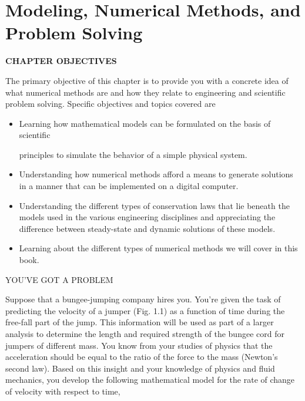 \documentclass[../main.tex]{subfiles}
\begin{document}
\chapter{Modeling, Numerical Methods, and Problem Solving}

\label{cha:cha3}


\begin{center}
\Large{\textbf{CHAPTER OBJECTIVES}}
\end{center}

\normalsize{The primary objective of this chapter is to provide you with a concrete idea of what
numerical methods are and how they relate to engineering and scientific problem
solving. Specific objectives and topics covered are}

\begin{itemize}

\item Learning how mathematical models can be formulated on the basis of scientific

principles to simulate the behavior of a simple physical system.
\item Understanding how numerical methods afford a means to generate solutions in a
manner that can be implemented on a digital computer.

\item Understanding the different types of conservation laws that lie beneath the models
used in the various engineering disciplines and appreciating the difference
between steady-state and dynamic solutions of these models.

\item Learning about the different types of numerical methods we will cover in this
book.

\end{itemize}
\Large{YOU'VE GOT A PROBLEM}


\normalsize{Suppose that a bungee-jumping company hires you. You're given the task of predicting the velocity of a jumper (Fig. 1.1)  as a function of time during the free-fall part
of the jump. This information will be used as part of a larger analysis to determine the
length and required strength of the bungee cord for jumpers of different mass.
You know from your studies of physics that the acceleration should be equal to the ratio
of the force to the mass (Newton's second law). Based on this insight and your knowledge of physics and fluid mechanics, you develop the following mathematical model for the rate
of change of velocity with respect to time, }
\newpage
\end{document}
